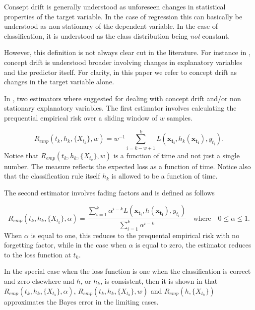 Consept drift is generally understood as unforeseen changes in statistical properties of the target variable.  In the case of regression this can basically be understood as non stationary of the dependent variable.  In the case of classification, it is understood as the class distribution being \emph{not} constant.  

However, this definition is not always clear cut in the literature.  For instance in \cite{Brz14}, concept drift is understood broader involving changes in explanatory variables and the predictor itself.    For clarity, in this paper we refer to concept drift as changes in the target variable alone.

In \cite{Gam13}, two estimators where suggested for dealing with concept drift and/or non stationary explanatory variables.  The first estimator involves calculating the prequential empirical risk over a sliding window of $w$ samples. 

\begin{equation}
\label{eq:prequentialRisk2}
R_{emp}(t_k, h_k, \{X_{t_k}\}, w) = w^{-1} \sum_{i=k - w +1}^k L(\bm{x_{t_i}} , h_k(\bm{x_{t_i}} ), y_{t_i}).
\end{equation}
Notice that $R_{emp}(t_k, h_k, \{X_{t_k}\}, w)$ is a function of time and not just a single number.  The measure reflects the expected loss as a function of time.  Notice also that the classification rule itself $h_k$ is allowed to be a function of time.

The second estimator involves fading factors and is defined as follows

\begin{equation}
\label{eq:prequentialRisk3}
R_{emp}(t_k, h_k, \{X_{t_k}\}, \alpha) =\frac{\sum_{i=1}^k \alpha^{i-k}L(\bm{x_{t_i}} , h(\bm{x_{t_i}} ), y_{t_i})}{\sum_{i=1}^k \alpha^{i-k}} \quad \mbox{where} \quad 0 \leq \alpha \leq 1.
\end{equation}
When $\alpha$ is equal to one, this reduces to the prequental empirical risk with no forgetting factor, while in the case when $\alpha$ is equal to zero, the estimator reduces to the loss function at $t_k$.

In the special case when the loss function is one when the classification is correct and zero elsewhere and $h$, or $h_k$, is consistent, then it is shown in \cite{Gam13} that 
$R_{emp}(t_k, h_k, \{X_{t_k}\}, \alpha)$, $R_{emp}(t_k, h_k, \{X_{t_k}\}, w) $ and $R_{emp}(h, \{X_{t_k}\})$ approximates the Bayes error in the limiting cases.

